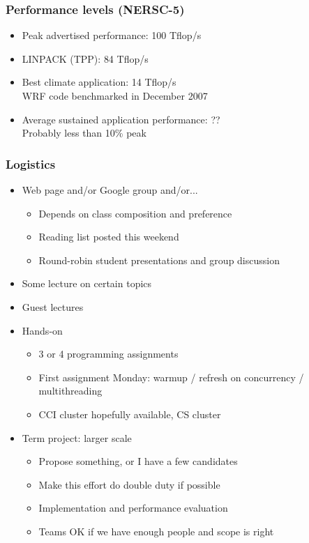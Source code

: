 \documentclass{beamer}
\begin{document}
\begin{frame}
\frametitle{Performance levels (NERSC-5)}

\begin{itemize}
\item Peak advertised performance: {\color{red} 100 Tflop/s}
\item LINPACK (TPP): {\color{red} 84 Tflop/s}
\item Best climate application: {\color{red} 14 Tflop/s}\\
WRF code benchmarked in December 2007
\item Average sustained application performance: {\color{red} ??}\\
Probably less than 10\% peak
\end{itemize}
\end{frame}

\begin{frame}
\frametitle{Logistics}

\begin{itemize}

\item Web page and/or Google group and/or...
\begin{itemize}
\item Depends on class composition and preference
\item Reading list posted this weekend
\item Round-robin student presentations and group discussion
\end{itemize}


\item Some lecture on certain topics

\item Guest lectures

\item Hands-on
\begin{itemize}
\item 3 or 4 programming assignments
\item First assignment Monday:  warmup / refresh on concurrency /
  multithreading
\item CCI cluster hopefully available, CS cluster
\end{itemize}

\item Term project:  larger scale
\begin{itemize}
\item Propose something, or I have a few candidates
\item Make this effort do double duty if possible
\item Implementation and performance evaluation
\item Teams OK if we have enough people and scope is right
\end{itemize}

\end{itemize}
\end{frame}
\end{document}
